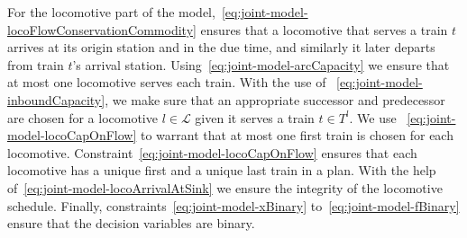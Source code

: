 For the locomotive part of the model,~\eqref{eq:joint-model-locoFlowConservationCommodity} ensures that a locomotive that serves a train $t$ arrives at its origin station and in the due time, and similarly it later departs from train $t$'s arrival station. Using~\eqref{eq:joint-model-arcCapacity} we ensure that at most one locomotive serves each train. With the use of ~\eqref{eq:joint-model-inboundCapacity}, we make sure that an appropriate successor and predecessor are chosen for a locomotive $l \in \mathscr{L}$ given it serves a train $t \in T^l$. We use ~\eqref{eq:joint-model-locoCapOnFlow} to warrant that at most one first train is chosen for each locomotive. Constraint~\eqref{eq:joint-model-locoCapOnFlow} ensures that each locomotive has a unique first and a unique last train in a plan. With the help of~\eqref{eq:joint-model-locoArrivalAtSink} we ensure the integrity of the locomotive schedule.
Finally, constraints~\eqref{eq:joint-model-xBinary} to~\eqref{eq:joint-model-fBinary} ensure that the decision variables are binary.